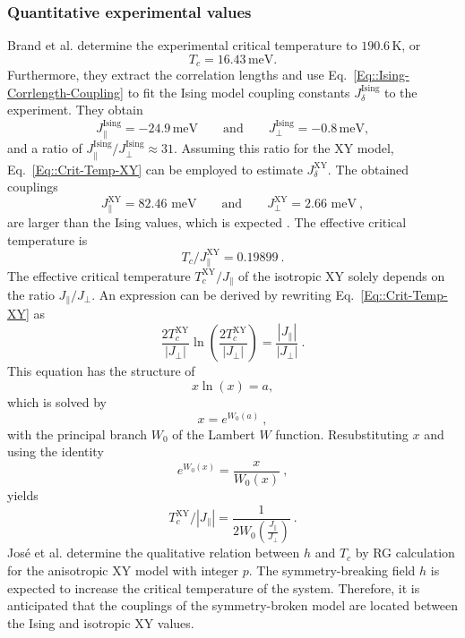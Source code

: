 	\subsubsection{Quantitative experimental values}
	Brand et al. \cite{brand2023dimer} determine the experimental critical temperature to $190.6\, \text{K}$, or  
	\begin{equation} \label{Eq::Exp-Tc}
		T_c =	16.43\, \text{meV.}
	\end{equation} 
	Furthermore, they extract the correlation lengths and use Eq.~\eqref{Eq::Ising-Corrlength-Coupling} to fit the Ising model coupling constants $J_\delta^{\text{Ising}}$ to the experiment. They obtain
	\begin{equation} \label{Eq::Exp-coupling-ising}
		J_\parallel^{\text{Ising}} =	-24.9\, \text{meV} 	\qquad \text{and} \qquad 	J_\perp^{\text{Ising}} =	-0.8\, \text{meV},
	\end{equation}
	and a ratio of $J_\parallel^{\text{Ising}} /	J_\perp^{\text{Ising}} \approx	31$.
	 Assuming this ratio for the XY model, Eq.~\eqref{Eq::Crit-Temp-XY} can be employed to estimate $J_\delta^{\text{XY}}$. The obtained couplings
	\begin{equation}
		J_\parallel^{\text{XY}} = 82.46 \text{ meV}\qquad \text{and} \qquad J_\perp^\text{XY} =	2.66 \text{ meV} ~,
	\end{equation}
	are larger than the Ising values, which is expected \cite{aizenman1980comparison}. 	The effective critical temperature is
	\begin{equation} \label{Eq::Tc-XY-31}
		T_c /	J_\parallel^{\text{XY}} =	0.19899~.
	\end{equation}
	The effective critical temperature $T_c^{\text{XY}} /	J_\parallel$ of the isotropic XY solely depends on the ratio $J_\parallel /	J_\perp$. An expression can be derived by rewriting Eq.~\eqref{Eq::Crit-Temp-XY} as
	\begin{equation}
		\frac{2 T_c^{\text{XY}}}{|J_\perp|} \ln \left(\frac{2 T_c^{\text{XY}}}{ |J_\perp|}\right) =	\frac{|J_\parallel|}{|J_\perp|}~.
	\end{equation}
	This equation has the structure of
	\begin{equation}
		x \ln (x) =	a,
	\end{equation}
	which is solved by
	\begin{equation}
		x =	e^{W_0 (a)}~,
	\end{equation}
	with the principal branch $W_0$ of the Lambert $W$ function. Resubstituting $x$ and using the identity
	\begin{equation}
		e^{W_0(x)} =	\frac{x}{W_0(x)} ~,
	\end{equation} 
	yields
	\begin{equation} \label{Eq::XY-crit-general-effective}
		{T^{\text{XY}}_c} /	{|J_\parallel|} =	\frac{1}{2 W_0 \left(\frac{J_\parallel}{J_\perp}\right)}~.
	\end{equation}
	José et al. \cite{jose1977renormalization} determine the qualitative relation between $h$ and $T_c$ by RG calculation for the anisotropic XY model with integer $p$. The symmetry-breaking field $h$ is expected to increase the critical temperature of the system.  Therefore, it is anticipated that the couplings of the symmetry-broken model are located between the Ising and isotropic XY values.	
